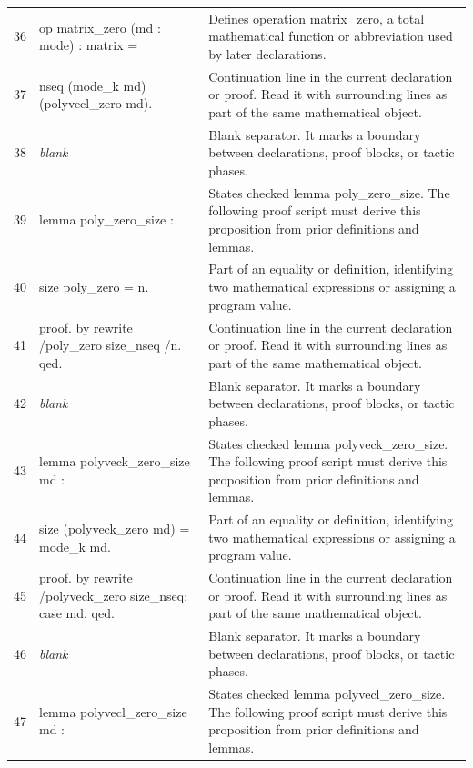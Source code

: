 \documentclass[10pt]{article}
\begin{document}
\begin{longtable}{r L{0.53\textwidth} L{0.37\textwidth}}
36 & {\ttfamily\scriptsize op matrix\_zero (md : mode) : matrix =} & Defines operation matrix\_zero, a total mathematical function or abbreviation used by later declarations. \\
37 & {\ttfamily\scriptsize   nseq (mode\_k md) (polyvecl\_zero md).} & Continuation line in the current declaration or proof.  Read it with surrounding lines as part of the same mathematical object. \\
38 & {\ttfamily\scriptsize \emph{blank}} & Blank separator.  It marks a boundary between declarations, proof blocks, or tactic phases. \\
39 & {\ttfamily\scriptsize lemma poly\_zero\_size :} & States checked lemma poly\_zero\_size.  The following proof script must derive this proposition from prior definitions and lemmas. \\
40 & {\ttfamily\scriptsize   size poly\_zero = n.} & Part of an equality or definition, identifying two mathematical expressions or assigning a program value. \\
41 & {\ttfamily\scriptsize proof. by rewrite /poly\_zero size\_nseq /n. qed.} & Continuation line in the current declaration or proof.  Read it with surrounding lines as part of the same mathematical object. \\
42 & {\ttfamily\scriptsize \emph{blank}} & Blank separator.  It marks a boundary between declarations, proof blocks, or tactic phases. \\
43 & {\ttfamily\scriptsize lemma polyveck\_zero\_size md :} & States checked lemma polyveck\_zero\_size.  The following proof script must derive this proposition from prior definitions and lemmas. \\
44 & {\ttfamily\scriptsize   size (polyveck\_zero md) = mode\_k md.} & Part of an equality or definition, identifying two mathematical expressions or assigning a program value. \\
45 & {\ttfamily\scriptsize proof. by rewrite /polyveck\_zero size\_nseq; case md. qed.} & Continuation line in the current declaration or proof.  Read it with surrounding lines as part of the same mathematical object. \\
46 & {\ttfamily\scriptsize \emph{blank}} & Blank separator.  It marks a boundary between declarations, proof blocks, or tactic phases. \\
47 & {\ttfamily\scriptsize lemma polyvecl\_zero\_size md :} & States checked lemma polyvecl\_zero\_size.  The following proof script must derive this proposition from prior definitions and lemmas. \\

\end{longtable}
\end{document}
